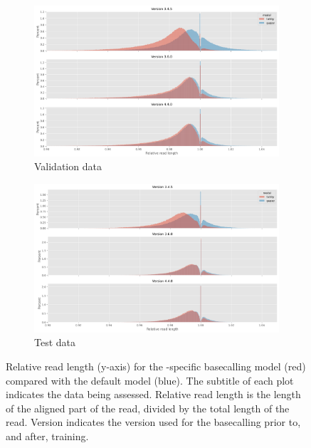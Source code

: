 \begin{figure}
     \centering
     \begin{subfigure}[b]{0.9\textwidth}
        \includegraphics[width=1\linewidth]{Chapter4/Figs/read_rel_len.png}
        \centering
        \caption{Validation data}
        \label{fig:eval-read-rel-len}
     \end{subfigure}
     \hfill
     \begin{subfigure}[b]{0.9\textwidth}
         \centering
        \includegraphics[width=1\linewidth]{Chapter4/Figs/test_read_rel_len.png}
         \caption{Test data}
         \label{fig:test-read-rel-len}
     \end{subfigure}
        \caption{Relative read length (y-axis) for the \mtb{}-specific basecalling model \tubby{} (red) compared with the default \guppy{} model (blue). The subtitle of each plot indicates the data being assessed. Relative read length is the length of the aligned part of the read, divided by the total length of the read. Version indicates the \guppy{} version used for the basecalling prior to, and after, training.}
        \label{fig:read-rel-len}
\end{figure}

